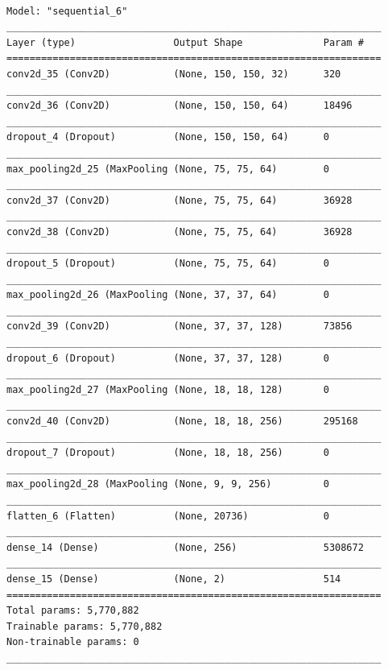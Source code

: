 \documentclass{article}
\begin{document}
\begin {verbatim}

Model: "sequential_6"
_________________________________________________________________
Layer (type)                 Output Shape              Param #   
=================================================================
conv2d_35 (Conv2D)           (None, 150, 150, 32)      320       
_________________________________________________________________
conv2d_36 (Conv2D)           (None, 150, 150, 64)      18496     
_________________________________________________________________
dropout_4 (Dropout)          (None, 150, 150, 64)      0         
_________________________________________________________________
max_pooling2d_25 (MaxPooling (None, 75, 75, 64)        0         
_________________________________________________________________
conv2d_37 (Conv2D)           (None, 75, 75, 64)        36928     
_________________________________________________________________
conv2d_38 (Conv2D)           (None, 75, 75, 64)        36928     
_________________________________________________________________
dropout_5 (Dropout)          (None, 75, 75, 64)        0         
_________________________________________________________________
max_pooling2d_26 (MaxPooling (None, 37, 37, 64)        0         
_________________________________________________________________
conv2d_39 (Conv2D)           (None, 37, 37, 128)       73856     
_________________________________________________________________
dropout_6 (Dropout)          (None, 37, 37, 128)       0         
_________________________________________________________________
max_pooling2d_27 (MaxPooling (None, 18, 18, 128)       0         
_________________________________________________________________
conv2d_40 (Conv2D)           (None, 18, 18, 256)       295168    
_________________________________________________________________
dropout_7 (Dropout)          (None, 18, 18, 256)       0         
_________________________________________________________________
max_pooling2d_28 (MaxPooling (None, 9, 9, 256)         0         
_________________________________________________________________
flatten_6 (Flatten)          (None, 20736)             0         
_________________________________________________________________
dense_14 (Dense)             (None, 256)               5308672   
_________________________________________________________________
dense_15 (Dense)             (None, 2)                 514       
=================================================================
Total params: 5,770,882
Trainable params: 5,770,882
Non-trainable params: 0
_________________________________________________________________





\end{verbatim}
\end{document}

